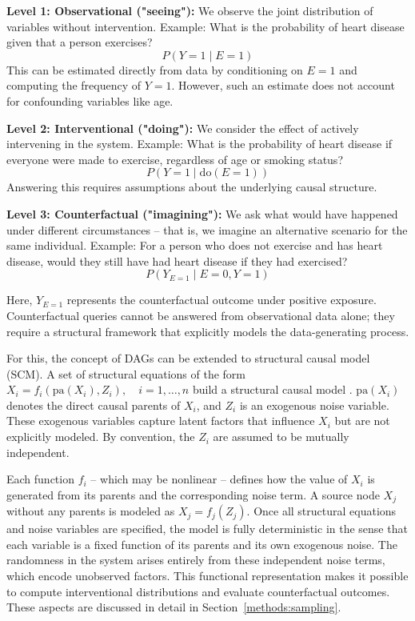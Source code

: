 \textbf{Level 1: Observational ("seeing"):}  
We observe the joint distribution of variables without intervention.  
Example: What is the probability of heart disease given that a person exercises?  
\[
P(Y = 1 \mid E = 1)
\]
This can be estimated directly from data by conditioning on $E = 1$ and computing the frequency of $Y = 1$. However, such an estimate does not account for confounding variables like age.



\textbf{Level 2: Interventional ("doing"):}  
We consider the effect of actively intervening in the system.  
Example: What is the probability of heart disease if everyone were made to exercise, regardless of age or smoking status?  
\[
P(Y = 1 \mid \text{do}(E = 1))
\]
Answering this requires assumptions about the underlying causal structure.



\textbf{Level 3: Counterfactual ("imagining"):}  
We ask what would have happened under different circumstances -- that is, we imagine an alternative scenario for the same individual.  
Example: For a person who does not exercise and has heart disease, would they still have had heart disease if they had exercised?  
\[
P(Y_{E=1} \mid E = 0, Y = 1)
\]

Here, $Y_{E=1}$ represents the counterfactual outcome under positive exposure. Counterfactual queries cannot be answered from observational data alone; they require a structural framework that explicitly models the data-generating process. 





For this, the concept of DAGs can be extended to structural causal model (SCM). A set of structural equations of the form $X_i = f_i(\text{pa}(X_i), Z_i), \quad i = 1, \dots, n$ build a structural causal model \citep{pearl_book2009}.  $\text{pa}(X_i)$ denotes the direct causal parents of $X_i$, and $Z_i$ is an exogenous noise variable. These exogenous variables capture latent factors that influence $X_i$ but are not explicitly modeled. By convention, the $Z_i$ are assumed to be mutually independent.

Each function $f_i$ -- which may be nonlinear -- defines how the value of $X_i$ is generated from its parents and the corresponding noise term. A source node $X_j$ without any parents is modeled as $X_j = f_j(Z_j)$. Once all structural equations and noise variables are specified, the model is fully deterministic in the sense that each variable is a fixed function of its parents and its own exogenous noise. The randomness in the system arises entirely from these independent noise terms, which encode unobserved factors. This functional representation makes it possible to compute interventional distributions and evaluate counterfactual outcomes. These aspects are discussed in detail in Section~\ref{methods:sampling}.


